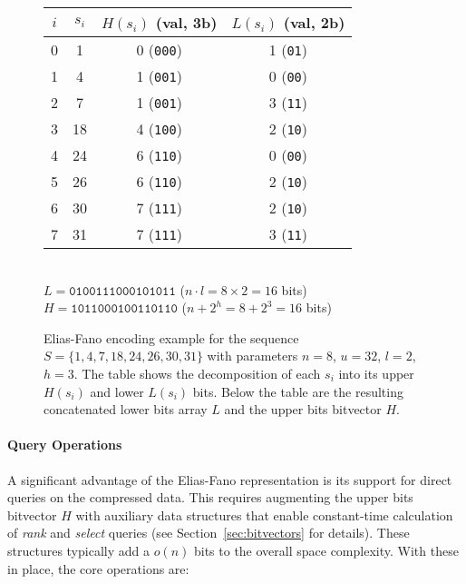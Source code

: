 \begin{figure}[hbtp] %
    \centering
    \footnotesize %
    \begin{tabular}{c | c | c c} \hline
        $i$ & $s_i$ & $H(s_i)$ (val, 3b) & $L(s_i)$ (val, 2b) \\ \hline
        0   & 1     & 0 (\texttt{000})   & 1 (\texttt{01})    \\
        1   & 4     & 1 (\texttt{001})   & 0 (\texttt{00})    \\
        2   & 7     & 1 (\texttt{001})   & 3 (\texttt{11})    \\
        3   & 18    & 4 (\texttt{100})   & 2 (\texttt{10})    \\
        4   & 24    & 6 (\texttt{110})   & 0 (\texttt{00})    \\
        5   & 26    & 6 (\texttt{110})   & 2 (\texttt{10})    \\
        6   & 30    & 7 (\texttt{111})   & 2 (\texttt{10})    \\
        7   & 31    & 7 (\texttt{111})   & 3 (\texttt{11})    \\ \hline
    \end{tabular} \\ %
    \vspace{0.5em} %
    $L = \texttt{0100111000101011}$ ($n \cdot l = 8 \times 2 = 16$ bits) \\
    $H = \texttt{1011000100110110}$ ($n + 2^h = 8 + 2^3 = 16$ bits)
    \caption[Elias-Fano encoding example]{Elias-Fano encoding example for the sequence $S = \{1, 4, 7, 18, 24, 26, 30, 31\}$ with parameters $n=8$, $u=32$, $l=2$, $h=3$. The table shows the decomposition of each $s_i$ into its upper $H(s_i)$ and lower $L(s_i)$ bits. Below the table are the resulting concatenated lower bits array $L$ and the upper bits bitvector $H$.}
    \label{fig:ef_code_example_revised} %
\end{figure}

\paragraph{Query Operations}
A significant advantage of the Elias-Fano representation is its support for direct queries on the compressed data. This requires augmenting the upper bits bitvector $H$ with auxiliary data structures that enable constant-time calculation of \emph{rank} and \emph{select} queries (see Section~\ref{sec:bitvectors} for details). These structures typically add a $o(n)$ bits to the overall space complexity. With these in place, the core operations are:

